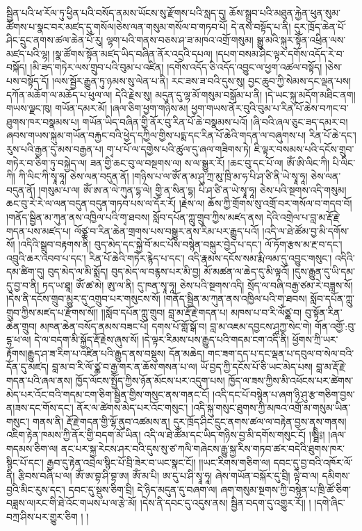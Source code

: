 སྦྱིན་པའི་ཕ་རོལ་ཏུ་ཕྱིན་པའི་བསོད་ནམས་ཡོངས་སུ་རྫོགས་པའི་སླད་དུ། ཆོས་སྒྲུབ་པའི་མཐུན་རྐྱེན་ཕུན་སུམ་ཚོགས་པ་སྣང་བར་མཛད་དུ་གསོལ།ཅེས་ལན་གསུམ་གསོལ་བ་གཏབ་པོ། དེ་ནས་བསྟོད་པ་ནི། དུར་ཁྲོད་ཆེན་པོ་ཤིང་དྲུང་ནགས་ཚལ་ཆེན་པོ་རུ། ལྷག་པའི་གནས་བཅས་ཤ་ཟ་མཁའ་འགྲོ་གསུམ། སྒྱུ་མའི་སྐུར་སྟོན་འཕྲིན་ལས་མཛད་པའི་ལྷ། །སྣ་ཚོགས་སྟོན་མཛད་ཡིད་བཞིན་ནོར་འདྲའི་དཔལ། །དཔག་བསམ་ཤིང་ལྟར་དགོས་འདོད་རེ་བ་བསྐོད། །མི་ཟད་གཏེར་ལས་གྲུབ་པའི་བུམ་པ་འཛིན། །དགོས་འདོད་ཅི་འདོད་འབྱུང་ལ་ཕྱག་འཚལ་བསྟོད། །ཅེས་པས་བསྟོད་དོ། །ལས་སྦྱོར་རྒྱུན་ཏུ་ཉམས་སུ་ལེན་པ་ནི། རང་ཟས་ཟ་བའི་དུས་སུ། བྱང་ཆུབ་ཀྱི་སེམས་དང་ལྡན་པས། དཀོན་མཆོག་ལ་མཆོད་པ་ཕུལ་ལ། དེའི་རྗེས་སུ། མདུན་དུ་ལྷ་མོ་གསུམ་བསྒོམ་པ་ནི། །དེ་ཡང་སྐུ་མདོག་མཐིང་ནག།གཡས་ལྗང་ཁུ། གཡོན་དམར་མོ། །ཞལ་ཅིག་ཕྱག་གཉིས་མ། ཕྱག་གཡས་ནོར་བུའི་བུམ་པ་རིན་པོ་ཆེས་བཀང་བ་ཐུགས་ཁར་བསྣམས་པ། གཡོན་ཡིད་བཞིན་གྱི་ནོར་བུ་རིན་པོ་ཆེ་བསྣམས་པའོ། །ཞི་བའི་ཞལ་ཅུང་ཟད་དམར་བ།ཞབས་གཡས་སྐུམ་གཡོན་བརྐྱང་བའི་ཕྱེད་དཀྱིལ་གྱིས་པདྨ་དང་རིན་པོ་ཆེའི་གདན་ལ་བཞུགས་པ། རིན་པོ་ཆེ་དང་། རུས་པའི་རྒྱན་དུ་མས་བརྒྱན་པ། གྭ་པ་པོ་ལ་དགྱེས་པའི་ཚུལ་དུ་ཞལ་གཟིགས་ཏེ། ཇི་ལྟར་བསམས་པའི་དངོས་གྲུབ་གཏེར་བ་ཅིག་ཏུ་བསྐྱེད་ལ། ཟན་གྱི་ཆང་བུ་ལ་བསྔགས་ལ། ས་ལ་སྒྱུར་རོ། །ཆང་བུ་དང་པོ་ལ། ཨོཾ་ཨི་ལིང་ཀི། པི་ལིང་ཀི། ཀི་ལིང་ཀི་སྭཱ་ཧཱ། ཅེས་ལན་བདུན་ནོ། །གཉིས་པ་ལ་ཨོཾ་ན་མ་ཤུ་ཀྲ་མུ་ཁྲི་མ་ཧ་པི་ཤ་ཙི་ནི་ཡེ་སྭཱ་ཧཱ། ཅེས་ལན་བདུན་ནོ། །གསུམ་པ་ལ། ཨོཾ་ཨ་ན་ལེ་ཀུན་དྷ་ལེ། གྱི་ན་སིན་དྷ། པི་ཤ་ཙི་ན་ཡེ་སྭཱ་ཧཱ། ཅེས་པའི་སྔགས་འདི་གསུམ། ཆང་བུ་རེ་རེ་ལ་ལན་བདུན་བདུན་གཏབ་པས་ལ་དོར་རོ། །རྗེས་ལ། ཆོས་ཀྱི་གྲོགས་སུ་འགྲོ་བར་གསོལ་བ་གདབ་བོ། །གནོད་སྦྱིན་མ་ཀུན་ནས་འཁྱིལ་པའི་གྭ་ཐབས། སློབ་དཔོན་ཀླུ་གྲུབ་ཀྱིས་མཛད་ནས། དེའི་འགྲེལ་པ་བླ་མ་རྡོ་རྗེ་གདན་པས་མཛད་པ། ལོཙྪ་བ་རིན་ཆེན་གྲགས་པས་བསྒྱུར་ནས་རིམ་པར་རྒྱུད་པའོ། །འདི་ལ་ཐེ་ཚོམ་བྱ་མི་དགོས་སོ། །འདིའི་སྒྲུབ་བརྟགས་ནི། བུད་མེད་དང་སྐྱེ་བོ་མང་པོས་བསྙེན་བསྐུར་བྱེད་པ་དང་། ལོ་ཏོག་རྩས་མ་རྔ་བ་དང་། འབྲུའི་ཆར་འབབ་པ་དང་། རིན་པོ་ཆེའི་གཏེར་རྙེད་པ་དང་། འདི་རྣམས་དངོས་སམ་རྨི་ལམ་དུ་འབྱུང་གསུང་། འདིའི་དམ་ཚིག་དུ། བུད་མེད་ལ་མི་སྨོད། བུད་མེད་ལ་བརྙས་པར་མི་བྱ། མོ་མཚན་ལ་ཆེད་དུ་མི་ལྟའོ། །དུས་རྒྱུན་དུ་ཡི་དམ་དུ་བྱ་བ་ནི། ཏད་ཡ་ཐཱ། ཨོཾ་ཚ་མེ། ཨུ་ལ་ནི། དུ་ཁན་སྭཱ་ཧཱ། ཅེས་པའི་སྔགས་འདི། སྲོད་ལ་བཞི་བརྒྱ་ཙམ་རེ་བཟླས་སོ། །དེས་ནི་དངོས་གྲུབ་མྱུར་དུ་འགྲུབ་པར་གསུངས་སོ། །གནོད་སྦྱིན་མ་ཀུན་ནས་འཁྱིལ་པའི་གྭ་ཐབས། སློབ་དཔོན་ཀླུ་གྲུབ་ཀྱིས་མཛད་པ་རྫོགས་སོ།། །།སློབ་དཔོན་ཀླུ་གྲུབ། བླ་མ་རྡོ་རྗེ་གདན་པ། མཁས་པ་བ་རི་ལོཙྪ་བ། བུ་སྟོན་རིན་ཆེན་གྲུབ། མཁན་ཆེན་བསོད་ནམས་བཟང་པོ། དགས་པོ་གློ་སྒོ་བ། བླ་མ་འཇམ་དབྱངས་ཤཱཀྱ་སེང་གེ། གོན་འགྱོ་:བུ་དྷ་ཕ་ལ། དེ་ལ་བདག་མི་སྐྱོད་རྡོ་རྗེས་ཞུས་སོ། །དེ་ལྟར་རིམས་པས་རྒྱུད་པའི་གདམ་ངག་འདི་ནི། ཕྱོགས་ཀྲི་ཡར་རྟོགས།རྒྱུད་ཤ་ཟ་རིག་པ་འཛིན་པའི་རྒྱུད་ནས་བསྡུས། དོན་མཆེད། གང་ཟག་དད་པ་དང་ལྡན་པ་དབུལ་བ་སེལ་བའི་དོན་དུ་མཛད། བླ་མ་བ་རི་ལོ་ཙྪ་བ་རྒྱ་གར་ན་ཆོས་གསན་པ་ལ། ཡོ་བྱད་ཀྱི་དངོས་པོ་ཅི་ཡང་མེད་པས། བླ་མ་རྡོ་རྗེ་གདན་པའི་ཞལ་ནས། ཁྱོད་ལོངས་སྤྱོད་ཀྱིས་ཉོན་མོངས་པར་འདུག་པས། ཁྱོད་ལ་ཟས་ཀྱིས་མི་འཕོངས་པར་ཚེགས་མེད་པར་འོང་བའི་གདམ་ངག་ཅིག་སྦྱིན་གྱིས་གསུང་ནས་གནང་ངོ། །འདི་དང་པོ་བསྙེན་པ་ཞག་ཉི་ཤུ་རྩ་གཅིག་བྱས་ན།ཟས་དང་གོས་དང་། ནོར་ལ་ཚེགས་མེད་པར་འོང་གསུང་། །འདི་སྐུ་གསུང་ཐུགས་ཀྱི་མཁའ་འགྲོ་མ་གསུམ་ཡིན་གསུང་། གནས་ནི། རྡོ་རྗེ་གདན་གྱི་ལྷོ་ནུབ་འཚམས་ན། དུར་ཁྲོད་ཤིང་དྲུང་ནགས་ཚལ་ལ་བརྟེན་བྱས་ནས་གནས།འཇིག་རྟེན་ཁམས་ཀྱི་ནོར་གྱི་བདག་མོ་ཡིན། འདི་ལ་ཐེ་ཚོམ་དང་ཡིད་གཉིས་བྱ་མི་དགོས་གསུང་ངོ། །ཨྠིི༔། །ཞལ་གདམས་ཅིག་ལ། ནང་པར་སྐྱ་རེངས་ཤར་བའི་དུས་སུ་ཙ་ཀལི་གཞེངས་རྒྱུ་སྐྱ་རིས་གཏབ་ཚར་བདེའི་ཐུགས་ཁར་སྙིང་པོ་དང་། རྒྱབ་དུ་རྟེན་འབྲེལ་སྙིང་པོ་བྲི་ཟེར་བ་ཡང་སྣང་ངོ།། །།ཡང་རིགས་གཅིག་ལ། དབང་དུ་བྱ་བའི་འཁོར་ལོ་ནི། རྩིབས་བཞི་པ་ལ། ཨོཾ་ཨ་བྷ་ཤི་བྷ་ཨ། ཨོཾ་མ་པི། ཨ་དུ་པ་ཤི་སྭཱ་ཧཱ། ཞེས་གཡོན་བསྐོར་དུ་བྲི། ལྟེ་བ་ལ། དམིགས་བྱའི་མིང་རུས་དང་། དབང་དུ་སྡུས་ཅིག་བྲི། དེ་ཉིད་མདུན་དུ་བཞག་ལ། ཞག་གསུམ་སྔགས་ཀྱི་བསྙེན་པ་ཁྲི་ཚོ་ཅིག་བཟླས་ལ།རང་གི་ཐེ་འོང་གཡས་པ་ལ་རྩེ་མོ། །དེས་ནི་དབང་དུ་འདུས་ནས། སྦྱིན་བདག་དུ་འགྱུར་རོ།། །
།དགེ་ཞིང་བཀྲ་ཤིས་པར་གྱུར་ཅིག ། །